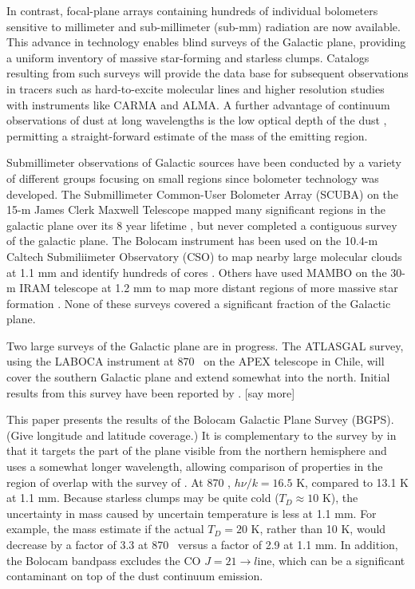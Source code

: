 \documentclass[12pt,preprint]{aastex}
\newcommand{\td}{\mbox{$T_D$}}
\newcommand{\jj}[2]{\mbox{$J = #1\rightarrow#2$}}
\begin{document}
In contrast, focal-plane arrays containing hundreds of individual
bolometers sensitive to millimeter and sub-millimeter (sub-mm)
radiation are now available. This advance in technology enables
blind surveys of the Galactic plane, providing a uniform inventory of massive
star-forming and starless clumps.  Catalogs resulting
from such surveys will provide the data base for subsequent observations
in tracers such as hard-to-excite molecular lines and higher resolution
studies with instruments like CARMA and ALMA.
A further advantage of continuum observations of dust at long wavelengths
is the low optical depth of the dust \citep{johnstone06},
permitting a straight-forward estimate of the mass of the emitting region.

Submillimeter observations of Galactic sources have been conducted by
a variety of different groups focusing on small regions since
bolometer technology was developed.  The Submillimeter Common-User
Bolometer Array (SCUBA) on the 15-m James Clerk Maxwell Telescope
mapped many significant regions in the galactic plane over its 8 year
lifetime \citep{holland99,difrancesco08}, but never completed a
contiguous survey of the galactic plane.  The Bolocam instrument has been
used on the 10.4-m Caltech Submiliimeter Observatory (CSO) to map nearby large
molecular clouds at 1.1 mm and identify hundreds of cores \citep{enoch06}.
Others have used MAMBO on the 30-m IRAM telescope at 1.2 mm to map
more distant regions of more massive star formation \citep{motte07}.
None of these surveys covered a significant fraction of the Galactic plane.

Two large surveys of the Galactic plane are in progress.
The ATLASGAL survey, using the LABOCA instrument at 870 \micron\
on the APEX telescope in Chile, will cover the southern Galactic plane
and extend somewhat into the north. Initial results from this survey
have been reported by \citet{schuller09}. [say more]

This paper presents the results of the Bolocam Galactic Plane Survey
(BGPS).  (Give longitude and latitude coverage.)
It is complementary to the survey by \citet{schuller09} in that
it targets the part of the plane visible from the northern
hemisphere and uses a somewhat longer wavelength, allowing
comparison of properties in the region of overlap with the survey of
\citet{schuller09}.
At 870 \micron, $h\nu/k = 16.5$ K, compared to 13.1 K at 1.1 mm.
Because starless clumps may be quite cold ($\td \approx 10$ K),
the uncertainty in mass caused by uncertain temperature is less at 1.1 mm.
For example, the mass estimate if the actual $\td = 20$ K, rather
than 10 K, would decrease by a factor of 3.3 at 870 \micron\
versus a factor of 2.9 at 1.1 mm. In addition, the Bolocam bandpass
excludes the CO \jj{21} line, which can be a significant contaminant
on top of the dust continuum emission.
\end{document}
